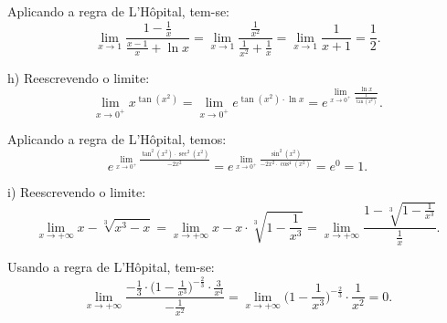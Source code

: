 \documentclass{article}
\begin{document}
{\begin{newpage}
\par Aplicando a regra de L'Hôpital, tem-se:
\begin{equation*} \displaystyle{\lim_{x\to 1} \frac{1 - \frac{1}{x}}{\frac{x-1}{x} + \ln{x}} = \lim_{x\to 1} \frac{\frac{1}{x^2}}{\frac{1}{x^2} + \frac{1}{x}} = \lim_{x\to 1} \frac{1}{x+1} = \frac{1}{2}.}\end{equation*}
\par
\vspace{0.3cm}
h) Reescrevendo o limite:
\begin{equation*} \displaystyle{\lim_{x\to 0^{+}} x^{\tan{(x^2)}} = \lim_{x\to 0^{+}} e^{\tan{(x^2)}\cdot\ln{x}} = e^{\lim_{x\to 0^{+}} \frac{\ln{x}}{\frac{1}{\tan{(x^2)}}}}}.\end{equation*}
\par Aplicando a regra de L'Hôpital, temos:
\begin{equation*} \displaystyle{e^{\lim_{x\to 0^{+}} \frac{\tan^{2}{(x^2)}\cdot\sec^{2}{(x^2)}}{-2x^2}} = e^{\lim_{x\to 0^{+}} \frac{\sin^{2}{(x^2)}}{-2x^{2}\cdot\cos^{4}{(x^2)}}} = e^{0} = 1}.\end{equation*}
\par
\vspace{0.3cm}
i) Reescrevendo o limite:
\begin{equation*} \displaystyle{\lim_{x\to +\infty } x - \sqrt[3]{x^3 - x} = \lim_{x\to +\infty } x - x\cdot\sqrt[3]{1 - \frac{1}{x^3}} = \lim_{x\to +\infty } \frac{1 - \sqrt[3]{1 - \frac{1}{x^3}}}{\frac{1}{x}}}. \end{equation*}
\par Usando a regra de L'Hôpital, tem-se:
\begin{equation*} \displaystyle{\lim_{x\to +\infty } \frac{-\frac{1}{3}\cdot\Big(1 - \frac{1}{x^3}\Big)^{-\frac{2}{3}}\cdot\frac{3}{x^4}}{-\frac{1}{x^2}} = \lim_{x\to +\infty }\Big(1 - \frac{1}{x^3}\Big)^{-\frac{2}{3}}\cdot\frac{1}{x^2} = 0}.\end{equation*}
\par
\vspace{0.3cm}

\end{newpage}}
\end{document}

